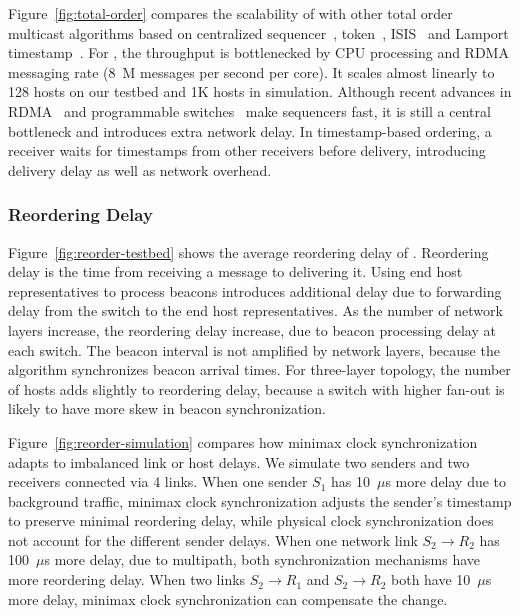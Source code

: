Figure~\ref{fig:total-order} compares the scalability of \sys with other total order multicast algorithms based on centralized sequencer~\cite{eris,kaminsky2016design}, token~\cite{rajagopalan1989token}, ISIS~\cite{birman1985replication} and Lamport timestamp~\cite{lamport1978time}.
For \sys, the throughput is bottlenecked by CPU processing and RDMA messaging rate (8~M messages per second per core).
It scales almost linearly to 128 hosts on our testbed and 1K hosts in simulation.
Although recent advances in RDMA~\cite{kaminsky2016design} and programmable switches~\cite{eris} make sequencers fast, it is still a central bottleneck and introduces extra network delay.
In timestamp-based ordering, a receiver waits for timestamps from  other receivers before delivery, introducing delivery delay as well as network overhead.




\subsubsection{Reordering Delay}
\label{sec:eval-delay}

Figure~\ref{fig:reorder-testbed} shows the average reordering delay of \sys.
Reordering delay is the time from receiving a message to delivering it.
Using end host representatives to process beacons introduces additional delay due to forwarding delay from the switch to the end host representatives.
As the number of network layers increase, the reordering delay increase, due to beacon processing delay at each switch.
The beacon interval is not amplified by network layers, because the algorithm synchronizes beacon arrival times.
For three-layer topology, the number of hosts adds slightly to reordering delay, because a switch with higher fan-out is likely to have more skew in beacon synchronization.

Figure~\ref{fig:reorder-simulation} compares how minimax clock synchronization adapts to imbalanced link or host delays.
We simulate two senders and two receivers connected via 4 links.
When one sender $S_1$ has 10~$\mu$s more delay due to background traffic, minimax clock synchronization adjusts the sender's timestamp to preserve minimal reordering delay, while physical clock synchronization does not account for the different sender delays.
When one network link $S_2 \rightarrow R_2$ has 100~$\mu$s more delay, due to multipath, both synchronization mechanisms have more reordering delay.
When two links $S_2 \rightarrow R_1$ and $S_2 \rightarrow R_2$ both have 10~$\mu$s more delay, minimax clock synchronization can compensate the change.



